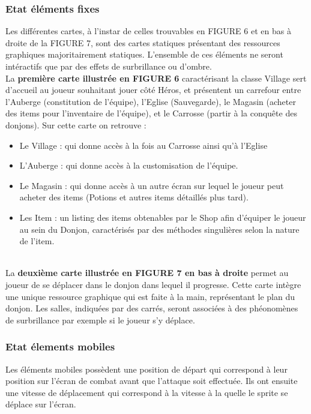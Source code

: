 \documentclass[a4paper,12pt]{article}
\begin{document}
\subsubsection{Etat éléments fixes}
Les différentes cartes, à l'instar de celles trouvables en FIGURE 6 et en bas à droite de la FIGURE 7, sont des cartes statiques présentant des ressources graphiques majoritairement statiques. L'ensemble de ces éléments ne seront intéractifs que par des effets de surbrillance ou d'ombre. 
\\ \indent
La \textbf{première carte illustrée en FIGURE 6} caractérisant la classe Village sert d'accueil au joueur souhaitant jouer côté Héros, et présentent un carrefour entre l'Auberge (constitution de l'équipe), l'Eglise (Sauvegarde), le Magasin (acheter des items pour l'inventaire de l'équipe), et le Carrosse (partir à la conquête des donjons). Sur cette carte on retrouve : 
\begin{itemize}
    \item Le Village : qui donne accès à la fois au Carrosse ainsi qu'à l'Eglise
    \item L'Auberge : qui donne accès à la customisation de l'équipe.
    \item Le Magasin : qui donne accès à un autre écran sur lequel le joueur peut acheter des items (Potions et autres items détaillés plus tard).
    \item Les Item : un listing des items obtenables par le Shop afin d'équiper le joueur au sein du Donjon, caractérisés par des méthodes singulières selon la nature de l'item.
\end{itemize}
\\ \indent
La \textbf{deuxième carte illustrée en FIGURE 7 en bas à droite} permet au joueur de se déplacer dans le donjon dans lequel il progresse. Cette carte intègre une unique ressource graphique qui est faite à la main, représentant le plan du donjon. Les salles, indiquées par des carrés, seront associées à des phéonomènes de surbrillance par exemple si le joueur s'y déplace.



\subsubsection{Etat élements mobiles}
Les éléments mobiles possèdent une position de départ qui correspond à leur position sur l'écran de combat avant que l'attaque soit effectuée. Ils ont ensuite une vitesse de déplacement qui correspond à la vitesse à la quelle le sprite se déplace sur l'écran. 
\end{document}
